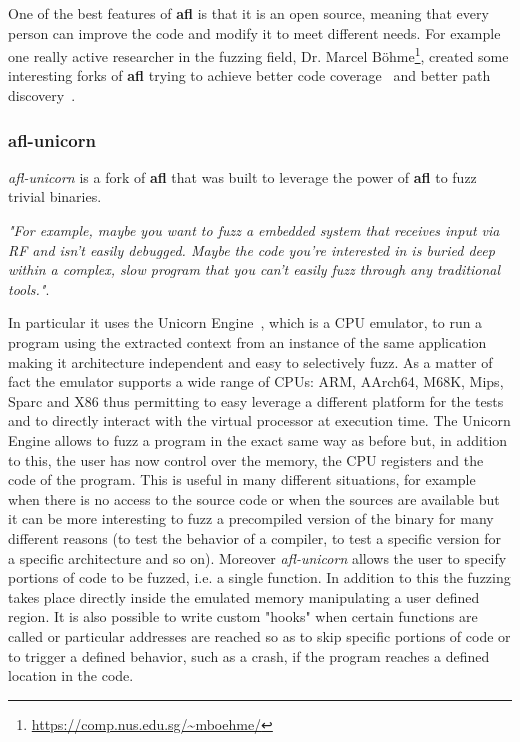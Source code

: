\documentclass[../main.tex]{subfiles}
\begin{document}
\bigskip One of the best features of \textbf{\acrshort{afl}} is that it is an open source, meaning that every person can improve the code and modify it to meet different needs. For example one really active researcher in the fuzzing field, Dr. Marcel B\"ohme\footnote{\url{https://comp.nus.edu.sg/~mboehme/}}, created some interesting forks of \textbf{\acrshort{afl}} trying to achieve better code coverage~\cite{aflfast, greybf} and better path discovery~\cite{pythia}.

\subsubsection{afl-unicorn}
\label{sub:afl-unicorn}

\textit{afl-unicorn} is a fork of \textbf{\acrshort{afl}}  that was built to leverage the power of \textbf{\acrshort{afl}} to fuzz trivial binaries.

\textit{"For example, maybe you want to fuzz a embedded system that receives input via RF and isn’t easily debugged. Maybe the code you’re interested in is buried deep within a complex, slow program that you can’t easily fuzz through any traditional tools."}\cite{aflunicorn}.

In particular it uses the Unicorn Engine~\cite{unicorn}, which is a CPU emulator, to run a program using the extracted context from an instance of the same application making it architecture independent and easy to selectively fuzz. As a matter of fact the emulator supports a wide range of CPUs: ARM, AArch64, M68K, Mips, Sparc and X86 thus permitting to easy leverage a different platform for the tests and to directly interact with the virtual processor at execution time. The Unicorn Engine allows to fuzz a program in the exact same way as before but, in addition to this, the user has now control over the memory, the CPU registers and the code of the program. This is useful in many different situations, for example when there is no access to the source code or when the sources are available but it can be more interesting to fuzz a precompiled version of the binary for many different reasons (to test the behavior of a compiler, to test a specific version for a specific architecture and so on). Moreover \textit{afl-unicorn} allows the user to specify portions of code to be fuzzed, i.e. a single function. In addition to this the fuzzing takes place directly inside the emulated memory manipulating a user defined region. It is also possible to write custom "hooks" when certain functions are called or particular addresses are reached so as to skip specific portions of code or to trigger a defined behavior, such as a crash, if the program reaches a defined location in the code.
\end{document}
